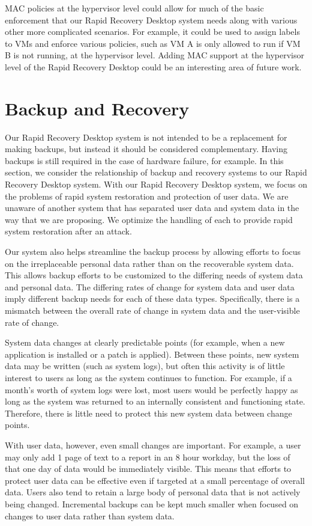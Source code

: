 MAC policies at the hypervisor level could allow for much of the basic enforcement that our Rapid Recovery Desktop system needs along with various other more complicated scenarios. For example, it could be used to assign labels to VMs and enforce various policies, such as VM A is only allowed to run if VM B is not running, at the hypervisor level. Adding MAC support at the hypervisor level of the Rapid Recovery Desktop could be an interesting area of future work.

\section{Backup and Recovery}

Our Rapid Recovery Desktop system is not intended to be a replacement for making backups, but instead it should be considered complementary. Having backups is still required in the case of hardware failure, for example. In this section, we consider the relationship of backup and recovery systems to our Rapid Recovery Desktop system. With our Rapid Recovery Desktop system, we focus on the problems of rapid system restoration and protection of user data. We are unaware of another system that has separated user data and system data in the way that we are proposing. We optimize the handling of each to provide rapid system restoration after an attack. 

Our system also helps streamline the backup process by allowing efforts to focus on the irreplaceable personal data rather than on the recoverable system data. This allows backup efforts to be customized to the differing needs of system data and personal data. The differing rates of change for system data and user data imply different backup needs for each of these data types. Specifically, there is a mismatch between the overall rate of change in system data and the user-visible rate of change. 
 
System data changes at clearly predictable points (for example, when a new application is installed or a patch is applied). Between these points, new system data may be written (such as system logs), but often this activity is of little interest to users as long as the system continues to function. For example, if a month's worth of system logs were lost, most users would be perfectly happy as long as the system was returned to an internally consistent and functioning state. Therefore, there is little need to protect this new system data between change points.
 
With user data, however, even small changes are important. For example, a user may only add 1 page of text to a report in an 8 hour workday, but the loss of that one day of data would be immediately visible. This means that efforts to protect user data can be effective even if targeted at a small percentage of overall data. Users also tend to retain a large body of personal data that is not actively being changed. Incremental backups can be kept much smaller when focused on changes to user data rather than system data.

